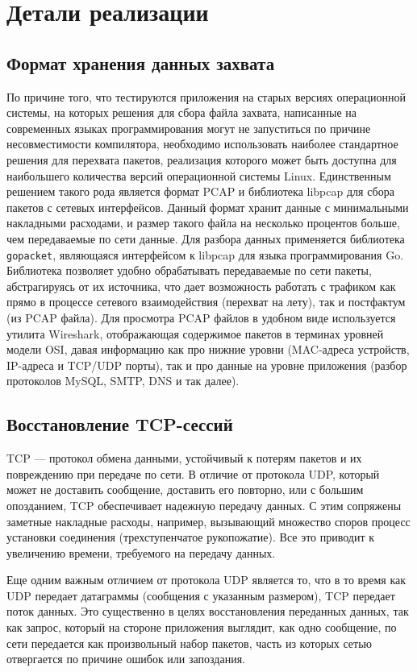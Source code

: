 \section{Детали реализации}
\subsection{Формат хранения данных захвата}
По причине того, что тестируются приложения на старых версиях операционной
системы, на которых решения для сбора файла захвата, написанные на современных
языках программирования могут не запуститься по причине несовместимости
компилятора, необходимо использовать наиболее стандартное решения для перехвата
пакетов, реализация которого может быть доступна для наибольшего количества
версий операционной системы Linux. Единственным решением такого рода является
формат PCAP и библиотека libpcap для сбора пакетов с сетевых интерфейсов. Данный
формат хранит данные с минимальными накладными расходами, и размер такого файла
на несколько процентов больше, чем передаваемые по сети данные.  Для разбора
данных применяется библиотека \lstinline{gopacket}, являющаяся интерфейсом к
libpcap для языка программирования Go. Библиотека позволяет удобно обрабатывать
передаваемые по сети пакеты, абстрагируясь от их источника, что дает возможность
работать с трафиком как прямо в процессе сетевого взаимодействия (перехват на
лету), так и постфактум (из PCAP файла).  Для просмотра PCAP файлов в удобном
виде используется утилита Wireshark, отображающая содержимое пакетов в терминах
уровней модели OSI, давая информацию как про нижние уровни (MAC-адреса
устройств, IP-адреса и TCP/UDP порты), так и про данные на уровне приложения
(разбор протоколов MySQL, SMTP, DNS и так далее).

\subsection{Восстановление TCP-сессий}
TCP --- протокол обмена данными, устойчивый к потерям пакетов и их повреждению
при передаче по сети. В отличие от протокола UDP, который может не доставить
сообщение, доставить его повторно, или с большим опозданием, TCP обеспечивает
надежную передачу данных. С этим сопряжены заметные накладные расходы, например,
вызывающий множество споров процесс установки соединения (трехступенчатое
рукопожатие). Все это приводит к увеличению времени, требуемого на передачу
данных.

Еще одним важным отличием от протокола UDP является то, что в то время как UDP
передает датаграммы (сообщения с указанным размером), TCP передает поток данных.
Это существенно в целях восстановления переданных данных, так как запрос,
который на стороне приложения выглядит, как одно сообщение, по сети передается
как произвольный набор пакетов, часть из которых сетью отвергается по причине
ошибок или запоздания.

